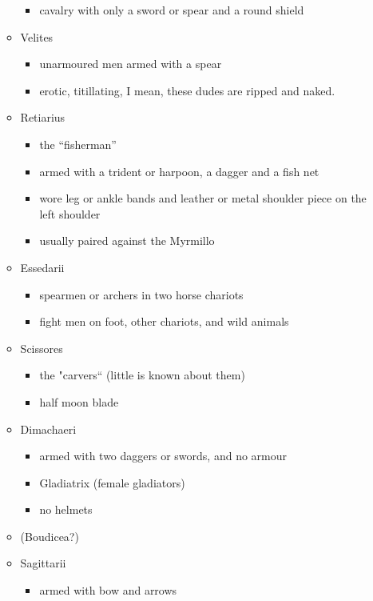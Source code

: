 \documentclass[12pt, twoside]{article}
\begin{document}
\begin{itemize}
\begin{itemize}
\begin{itemize}
		\item cavalry with only a sword or spear and a round shield
		\end{itemize}
	\item Velites
		\begin{itemize}
		\item unarmoured men armed with a spear
		\item erotic, titillating, I mean, these dudes are ripped and naked.
		\end{itemize}
	\item Retiarius
		\begin{itemize}
		\item the “fisherman”
		\item armed with a trident or harpoon, a dagger and a fish net
		\item wore leg or ankle bands and leather or metal shoulder piece on the left shoulder
		\item usually paired against the Myrmillo
		\end{itemize}
	\item Essedarii
		\begin{itemize}
		\item spearmen or archers in two horse chariots
		\item fight men on foot, other chariots, and wild animals
		\end{itemize}
	\item Scissores
		\begin{itemize}
		\item the "carvers“ (little is known about them)
		\item half moon blade
		\end{itemize}
	\item Dimachaeri
		\begin{itemize}
		\item armed with two daggers or swords, and no armour
		\item Gladiatrix (female gladiators)
		\item no helmets
		\end{itemize}
	\item (Boudicea?)
	\item Sagittarii
		\begin{itemize}
		\item armed with bow and arrows
		\end{itemize}
	\end{itemize}
\end{itemize}
\end{document}
